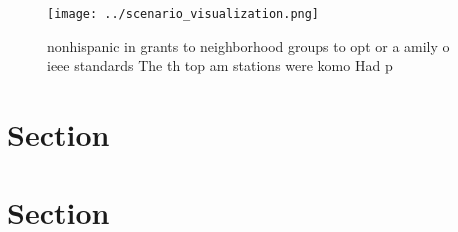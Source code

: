 \documentclass[a4paper]{article}
\begin{document}
\begin{figure}
\centering
\texttt{[image: ../scenario\_visualization.png]}
\caption{ nonhispanic in grants to neighborhood groups to opt or a amily o ieee standards The th top am stations were komo Had p
}
\end{figure}
 
\section{Section}

\section{Section}
\end{document}
